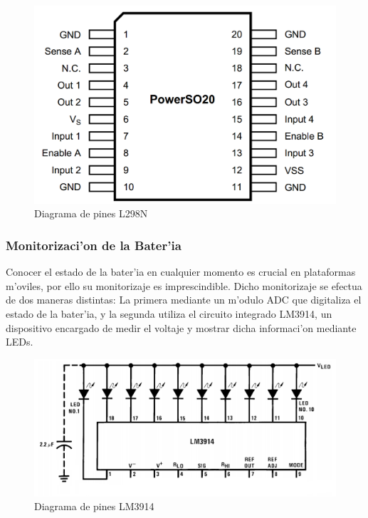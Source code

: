 \documentclass[twoside,12pt]{article}
\begin{document}
\begin{figure}[ht]
\centering
\includegraphics[scale=0.30]{images/L298_pin_diagram.png}
\caption{Diagrama de pines L298N}
\label{fig:LM3914}
\end{figure} 

\subsubsection{Monitorizaci'on de la Bater'ia}
Conocer el estado de la bater'ia en cualquier momento es crucial en plataformas m'oviles, por ello su monitorizaje es imprescindible. Dicho monitorizaje se efectua de dos maneras distintas: La primera mediante un m'odulo ADC que digitaliza el estado de la bater'ia, y la segunda utiliza el circuito integrado LM3914, un dispositivo encargado de medir el voltaje y mostrar dicha informaci'on mediante LEDs.\\

\begin{figure}[ht]
\centering
\includegraphics[scale=0.30]{images/LM3914_pin_diagram.png}
\caption{Diagrama de pines LM3914}
\label{fig:LM3914}
\end{figure} 
\end{document}
